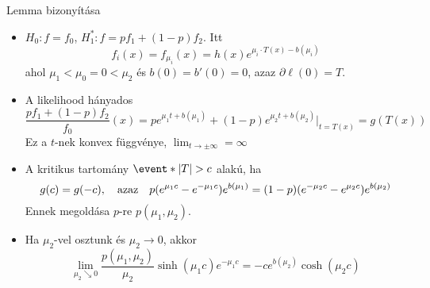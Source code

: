 \documentclass[aspectratio=169,notheorems,9pt,\option]{beamer}
\begin{document}
  \begin{frame}{Lemma bizonyítása}
    \begin{itemize}
    \item $H_0:f=f_0$, $H_1^*:f=pf_1+ (1-p)f_2$. Itt
      \begin{displaymath}
        f_i (x) = f_{\mu_i} (x)= h (x)e^{\mu_i\cdot T(x) - b (\mu_i)} 
      \end{displaymath}
      ahol $\mu_1<\mu_0=0<\mu_2$ és $b (0)=b' (0)=0$, azaz $\partial\ell (0)=T$.
    \item A likelihood hányados 
      \begin{displaymath}
        \frac{pf_1+ (1-p)f_2}{f_0} (x) 
        =p e^{\mu_1 t+b (\mu_1)}+(1-p)e^{\mu_2 t+b (\mu_2)}|_{t=T (x)}=g (T (x))
      \end{displaymath}
      Ez a $t$-nek konvex függvénye, $\lim_{t\to\pm\infty} =\infty$
    \item A kritikus tartomány $\event*{\abs*{T}>c}$ alakú, ha
      \begin{displaymath}
        g (c)=g (-c),\quad\text{azaz}\quad
        p(e^{\mu_1 c}-e^{-\mu_1c})e^{b (\mu_1)}
        = (1-p)(e^{-\mu_2 c}-e^{\mu_2c})e^{b (\mu_2)}
      \end{displaymath}
      Ennek megoldása $p$-re $p (\mu_1,\mu_2)$.
    \item Ha $\mu_2$-vel osztunk és $\mu_2\to0$, akkor
      \begin{displaymath}
        \lim_{\mu_2\searrow0}\frac{p (\mu_1,\mu_2)}{\mu_2} \sinh
        (\mu_1c)e^{-\mu_1 c}= -c e^{b (\mu_2)}\cosh (\mu_2c)
      \end{displaymath}
    \end{itemize}
    
  \end{frame}
\end{document}
